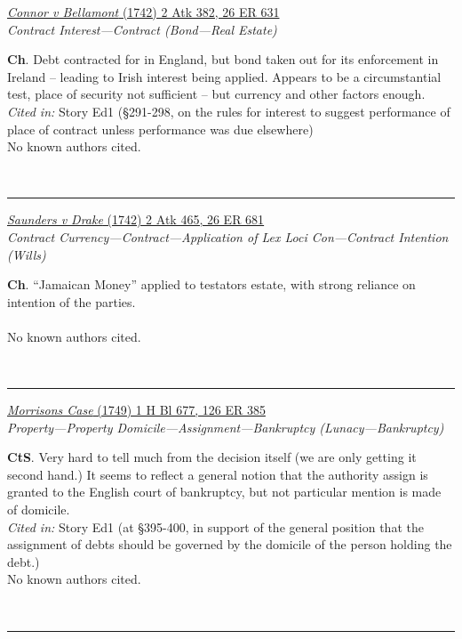 \documentclass[twoside]{article}
\begin{document}
        \begin{small}
        \begin{center}
        \href{https://heinonline.org/HOL/P?h=hein.engrep/engrc0026&i=639}{\textit{Connor v Bellamont} (1742) 2 Atk 382, 26 ER 631} \label{20} \\ 
\textit{Contract Interest---Contract (Bond---Real Estate)}\\
        \end{center}
        \textbf{Ch}. Debt contracted for in England, but bond taken out for its enforcement in Ireland – leading to Irish interest being applied. Appears to be a circumstantial test, place of security not sufficient – but currency and other factors enough.\\\textit{Cited in: }Story Ed1 (§291-298, on the rules for interest to suggest performance of place of contract unless performance was due elsewhere)\\No known authors cited.
        \end{small}\\
        \rule{\textwidth}{0.5pt}
        

        \begin{small}
        \begin{center}
        \href{https://heinonline.org/HOL/P?h=hein.engrep/engrc0026&i=689}{\textit{Saunders v Drake} (1742) 2 Atk 465, 26 ER 681} \label{24} \\ 
\textit{Contract Currency---Contract---Application of Lex Loci Con---Contract Intention (Wills)}\\
        \end{center}
        \textbf{Ch}. “Jamaican Money” applied to testators estate, with strong reliance on intention of the parties.\\\\No known authors cited.
        \end{small}\\
        \rule{\textwidth}{0.5pt}
        

        \begin{small}
        \begin{center}
        \href{https://heinonline.org/HOL/P?h=hein.engrep/engrg0126&i=389}{\textit{Morrisons Case} (1749) 1 H Bl 677, 126 ER 385} \label{127} \\ 
\textit{Property---Property Domicile---Assignment---Bankruptcy (Lunacy---Bankruptcy)}\\
        \end{center}
        \textbf{CtS}. Very hard to tell much from the decision itself (we are only getting it second hand.) It seems to reflect a general notion that the authority assign is granted to the English court of bankruptcy, but not particular mention is made of domicile.\\\textit{Cited in: }Story Ed1 (at §395-400, in support of the general position that the assignment of debts should be governed by the domicile of the person holding the debt.)\\No known authors cited.
        \end{small}\\
        \rule{\textwidth}{0.5pt}
        
\end{document}
